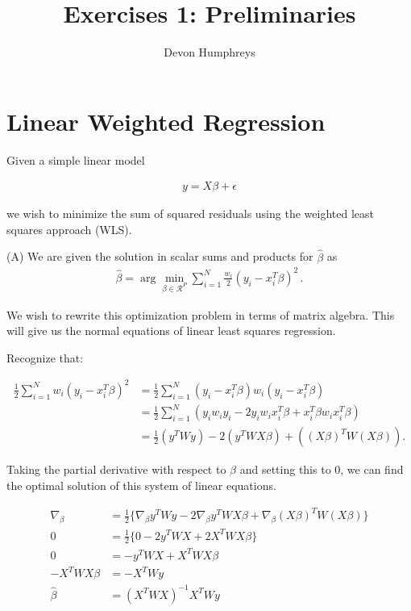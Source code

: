 \documentclass{article}
\title{Exercises 1: Preliminaries}
\author{Devon Humphreys}
\date{}  %
\begin{document}
\maketitle
\section{Linear Weighted Regression}

Given a simple linear model

\begin{align}
	y = X\beta + \epsilon 
\end{align}

we wish to minimize the sum of squared residuals using the weighted least squares approach (WLS).



(A) We are given the solution in scalar sums and products for $\hat{\beta}$ as 
\begin{align}
	{\hat{\beta}} = \arg \min_{\beta \in \mathcal{R}^P} \sum_{i=1}^N \frac{w_i}{2}(y_i - x_i^T \beta)^2 \, .
\end{align} 

We wish to rewrite this optimization problem in terms of matrix algebra. This will give us the normal equations of linear least squares regression. 

Recognize that: 

\begin{align}
	\frac{1}{2} \sum_{i=1}^Nw_i(y_i - x_i^T\beta)^2 & = \frac{1}{2}\sum_{i=1}^N(y_i - x_i^T\beta)w_i(y_i - x_i^T\beta) \\
	& = \frac{1}{2}\sum_{i=1}^N(y_iw_iy_i - 2y_iw_ix_i^T\beta + x_i^T\beta w_ix_i^T\beta) \\	
	& = \frac{1}{2}(y^T W y) - 2(y^T W X \beta) + ((X\beta)^T W (X\beta)). 
\end{align}

Taking the partial derivative with respect to $\beta$ and setting this to 0, we can find the optimal solution of this system of linear equations. 

\begin{align}
	\nabla_{\beta} 
	  &= \frac{1}{2}\{\nabla_{\beta}{y^T W y} - 2\nabla_{\beta}{y^T W X \beta} + \nabla_{\beta} {(X\beta)^T W (X\beta)}\} \\	0 &= \frac{1}{2} \{ 0 - 2{y^T W X} + 2 {X^T W X\beta} \} \\
	0 &= {-y^TWX} + {X^TWX\beta}\\
		 -{X^TWX\beta} &= -{X^TWy}\\
	  \hat{\beta} & = ({X^TWX})^{-1} {X^TWy}	  
\end{align}
\end{document}
